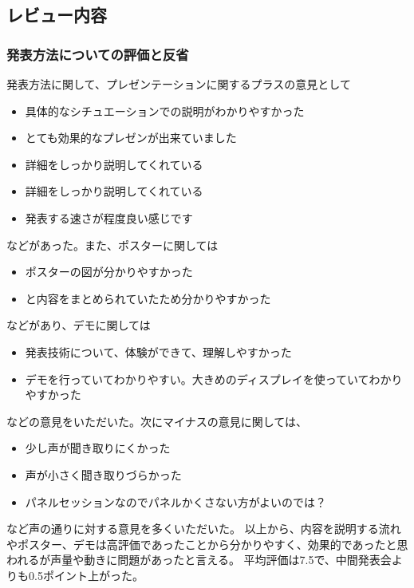 \documentclass[openany,11pt,papersize]{jsbook}
\begin{document}

\subsection{レビュー内容}

\subsubsection{発表方法についての評価と反省}
発表方法に関して、プレゼンテーションに関するプラスの意見として
\begin{itemize}

\item 具体的なシチュエーションでの説明がわかりやすかった
\item とても効果的なプレゼンが出来ていました
\item 詳細をしっかり説明してくれている
\item 詳細をしっかり説明してくれている
\item 発表する速さが程度良い感じです

\end{itemize}

などがあった。また、ポスターに関しては
\begin{itemize}

\item ポスターの図が分かりやすかった
\item と内容をまとめられていたため分かりやすかった

\end{itemize}

などがあり、デモに関しては
\begin{itemize}

\item 発表技術について、体験ができて、理解しやすかった
\item デモを行っていてわかりやすい。大きめのディスプレイを使っていてわかりやすかった

\end{itemize}

などの意見をいただいた。次にマイナスの意見に関しては、
\begin{itemize}

\item 少し声が聞き取りにくかった
\item 声が小さく聞き取りづらかった
\item パネルセッションなのでパネルかくさない方がよいのでは？

\end{itemize}
など声の通りに対する意見を多くいただいた。
以上から、内容を説明する流れやポスター、デモは高評価であったことから分かりやすく、効果的であったと思われるが声量や動きに問題があったと言える。
平均評価は7.5で、中間発表会よりも0.5ポイント上がった。
\end{document}
